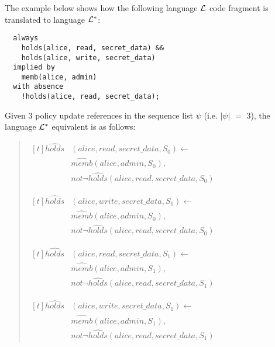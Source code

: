 \documentclass[10pt, twocolumn]{article}
\begin{document}
          The example below shows how the following language ${\cal L}$ code
          fragment is translated to language ${\cal L}^{*}$:

          \begin{verbatim}
  always
    holds(alice, read, secret_data) &&
    holds(alice, write, secret_data)
  implied by
    memb(alice, admin)
  with absence
    !holds(alice, read, secret_data);
          \end{verbatim}

          Given 3 policy update references in the sequence list $\psi$
          (i.e. $|\psi|$ $=$ $3$), the language ${\cal L}^{*}$ equivalent is as
          follows:

          \begin{quote}
            \begin{math}
              \begin{aligned}[t]
                \hat{holds}&(alice, read, secret\_data, S_{0}) \leftarrow \\
                 & \hat{memb}(alice, admin, S_{0}), \\
                 & not \lnot \hat{holds}(alice, read, secret\_data, S_{0})
              \end{aligned}
            \end{math}

            \begin{math}
              \begin{aligned}[t]
                \hat{holds}&(alice, write, secret\_data, S_{0}) \leftarrow \\
                 & \hat{memb}(alice, admin, S_{0}), \\
                 & not \lnot \hat{holds}(alice, read, secret\_data, S_{0})
              \end{aligned}
            \end{math}

            \begin{math}
              \begin{aligned}[t]
                \hat{holds}&(alice, read, secret\_data, S_{1}) \leftarrow \\
                 & \hat{memb}(alice, admin, S_{1}), \\
                 & not \lnot \hat{holds}(alice, read, secret\_data, S_{1})
              \end{aligned}
            \end{math}

            \begin{math}
              \begin{aligned}[t]
                \hat{holds}&(alice, write, secret\_data, S_{1}) \leftarrow \\
                 & \hat{memb}(alice, admin, S_{1}), \\
                 & not \lnot \hat{holds}(alice, read, secret\_data, S_{1})
              \end{aligned}
            \end{math}


\end{quote}
\end{document}
